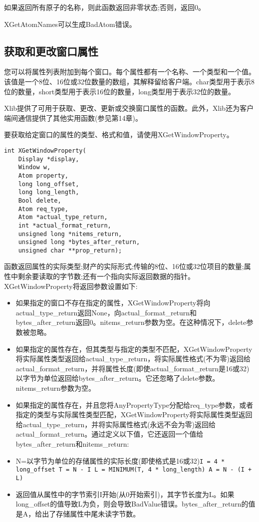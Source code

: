 如果返回所有原子的名称，则此函数返回非零状态;否则，返回0。

XGetAtomNames可以生成BadAtom错误。

\subsection{获取和更改窗口属性}

您可以将属性列表附加到每个窗口。每个属性都有一个名称、一个类型和一个值。该值是一个8位、16位或32位数量的数组，其解释留给客户端。char类型用于表示8位的数量，short类型用于表示16位的数量，long类型用于表示32位的数量。

Xlib提供了可用于获取、更改、更新或交换窗口属性的函数。此外，Xlib还为客户端间通信提供了其他实用函数(参见第14章)。

要获取给定窗口的属性的类型、格式和值，请使用XGetWindowProperty。

\begin{lstlisting}
int XGetWindowProperty(
	Display *display,
	Window w,
	Atom property,
	long long_offset,
	long long_length,
	Bool delete,
	Atom req_type,
	Atom *actual_type_return,
	int *actual_format_return,
	unsigned long *nitems_return,
	unsigned long *bytes_after_return,
	unsigned char **prop_return);
\end{lstlisting}

函数返回属性的实际类型;财产的实际形式;传输的8位、16位或32位项目的数量;属性中剩余要读取的字节数;还有一个指向实际返回数据的指针。XGetWindowProperty将返回参数设置如下:

\begin{itemize}
	\item 如果指定的窗口不存在指定的属性，XGetWindowProperty将向actual\_type\_return返回None，向actual\_format\_return和bytes\_after\_return返回0。nitems\_return参数为空。在这种情况下，delete参数被忽略。
	\item 如果指定的属性存在，但其类型与指定的类型不匹配，XGetWindowProperty将实际属性类型返回给actual\_type\_return，将实际属性格式(不为零)返回给actual\_format\_return，并将属性长度(即使actual\_format\_return是16或32)以字节为单位返回给bytes\_after\_return。它还忽略了delete参数。nitems\_return参数为空。
	\item 如果指定的属性存在，并且您将AnyPropertyType分配给req\_type参数，或者指定的类型与实际属性类型匹配，XGetWindowProperty将实际属性类型返回给actual\_type\_return，并将实际属性格式(永远不会为零)返回给actual\_format\_return。通过定义以下值，它还返回一个值给bytes\_after\_return和nitems\_return:
	\item N=以字节为单位的存储属性的实际长度(即使格式是16或32)\lstinline|I = 4 * long_offset T = N - I L = MINIMUM(T, 4 * long_length) A = N - (I + L)|
	\item 返回值从属性中的字节索引I开始(从0开始索引)，其字节长度为L。如果long\_offset的值导致L为负，则会导致BadValue错误。bytes\_after\_return的值是A，给出了存储属性中尾未读字节数。
\end{itemize}

